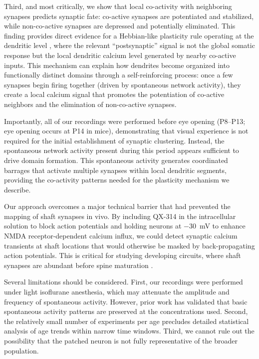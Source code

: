 \documentclass[11pt]{article}
\begin{document}
Third, and most critically, we show that local co-activity with neighboring synapses predicts synaptic fate: co-active synapses are potentiated and stabilized, while non-co-active synapses are depressed and potentially eliminated. This finding provides direct evidence for a Hebbian-like plasticity rule operating at the dendritic level \citep{hebb1949organization, markram1997regulation}, where the relevant ``postsynaptic'' signal is not the global somatic response but the local dendritic calcium level generated by nearby co-active inputs. This mechanism can explain how dendrites become organized into functionally distinct domains through a self-reinforcing process: once a few synapses begin firing together (driven by spontaneous network activity), they create a local calcium signal that promotes the potentiation of co-active neighbors and the elimination of non-co-active synapses.

Importantly, all of our recordings were performed before eye opening (P8--P13; eye opening occurs at P14 in mice), demonstrating that visual experience is not required for the initial establishment of synaptic clustering. Instead, the spontaneous network activity present during this period \citep{blankenship2010mechanisms, valeeva2019emergence} appears sufficient to drive domain formation. This spontaneous activity generates coordinated barrages that activate multiple synapses within local dendritic segments, providing the co-activity patterns needed for the plasticity mechanism we describe.

Our approach overcomes a major technical barrier that had prevented the mapping of shaft synapses in vivo. By including QX-314 in the intracellular solution to block action potentials and holding neurons at $-30$~mV to enhance NMDA receptor-dependent calcium influx, we could detect synaptic calcium transients at shaft locations that would otherwise be masked by back-propagating action potentials. This is critical for studying developing circuits, where shaft synapses are abundant before spine maturation \citep{kleindienst2011activity}.

Several limitations should be considered. First, our recordings were performed under light isoflurane anesthesia, which may attenuate the amplitude and frequency of spontaneous activity. However, prior work has validated that basic spontaneous activity patterns are preserved at the concentrations used. Second, the relatively small number of experiments per age precludes detailed statistical analysis of age trends within narrow time windows. Third, we cannot rule out the possibility that the patched neuron is not fully representative of the broader population.
\end{document}
